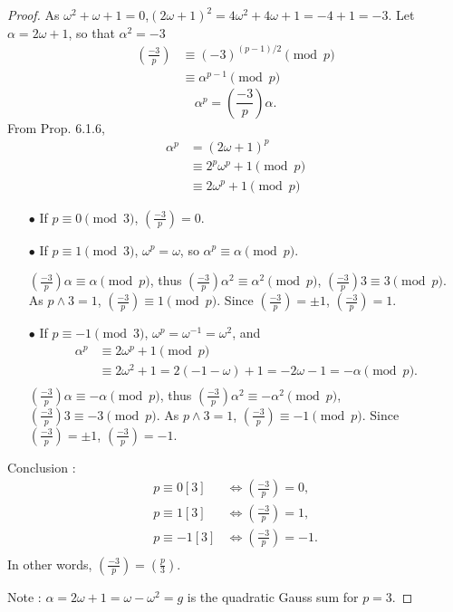 \documentclass[11pt,a4paper]{article}
\newcommand{\legendre}[2]{\genfrac{(}{)}{}{}{#1}{#2}}
\begin{document}
\begin{proof}
As $\omega^2+\omega+1 = 0$,$(2\omega+1)^2 = 4\omega^2+4\omega+1 = -4+1 = -3$. Let $\alpha = 2\omega+1$, so that $\alpha^2 = -3$
\begin{align*}
\legendre{-3}{p} &\equiv (-3)^{(p-1)/2} \pmod p\\
&\equiv \alpha^{p-1} \pmod p
\end{align*}
$$\alpha^p = \legendre{-3}{p} \alpha.$$
From Prop. 6.1.6,
\begin{align*}
\alpha^p &= (2\omega+1)^p\\
&\equiv 2^p \omega^p + 1 \pmod p\\
&\equiv 2 \omega^p + 1\pmod p
\end{align*}
\begin{enumerate}
\item[$\bullet$] If $p \equiv 0 \pmod 3$, $\legendre{-3}{p} = 0$.
\item[$\bullet$] If $p \equiv 1 \pmod 3$, $\omega^p  = \omega$, so $\alpha^p \equiv \alpha \pmod p$.

$\legendre{-3}{p} \alpha \equiv \alpha \pmod p$, thus $\legendre{-3}{p} \alpha^2 \equiv \alpha^2 \pmod p$, $\legendre{-3}{p} 3 \equiv 3 \pmod p$. As $p \wedge 3 = 1$, $\legendre{-3}{p}  \equiv 1 \pmod p$. Since $\legendre{-3}{p} = \pm 1$,  $\legendre{-3}{p}  = 1$.

\item[$\bullet$] If $p \equiv -1 \pmod 3$, $\omega^p = \omega^{-1} = \omega^2$, and
\begin{align*}
\alpha^p &\equiv 2 \omega^p + 1 \pmod p\\
&\equiv 2\omega^2 + 1 = 2(-1-\omega)+1 = -2 \omega - 1 = -\alpha\pmod p.\\
\end{align*}
$\legendre{-3}{p} \alpha \equiv -\alpha \pmod p$, thus $\legendre{-3}{p} \alpha^2 \equiv -\alpha^2 \pmod p$, $\legendre{-3}{p} 3 \equiv -3 \pmod p$. As $p \wedge 3 = 1$, $\legendre{-3}{p}  \equiv -1 \pmod p$. Since $\legendre{-3}{p} = \pm 1$,  $\legendre{-3}{p}  = -1$.
\end{enumerate}
Conclusion : 
\begin{align*}
p \equiv 0 [3] &\iff \legendre{-3}{p} = 0,\\
p \equiv 1 [3] &\iff \legendre{-3}{p} = 1,\\
p \equiv -1 [3] &\iff \legendre{-3}{p} = -1.\\
\end{align*}
In other words, $ \legendre{-3}{p} =  \legendre{p}{3}$.

Note : $\alpha = 2 \omega + 1 = \omega - \omega^2 = g$ is the quadratic Gauss sum for $p=3$.
\end{proof}
\end{document}
